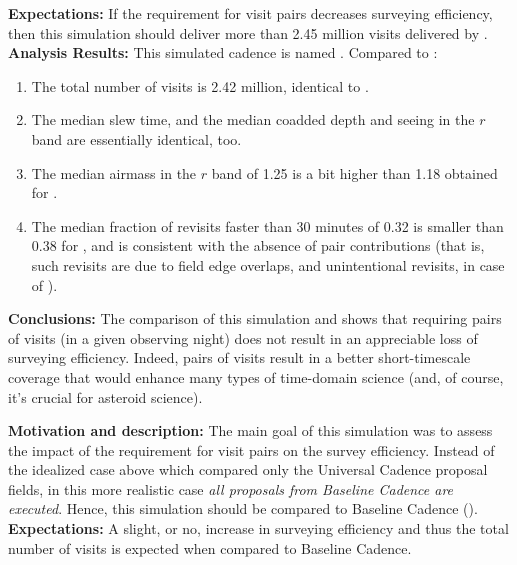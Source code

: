 {\bf Expectations:} If the requirement for visit pairs decreases
surveying efficiency, then this simulation should deliver more than
2.45 million visits delivered by . \\

{\bf Analysis Results:} This simulated cadence is named . Compared
to :
\begin{enumerate}
\item The total number of visits is 2.42 million, identical to .
\item The median slew time, and the median coadded depth and seeing in the $r$ band
are essentially identical, too.
\item The median airmass in the $r$ band of 1.25 is a bit higher than 1.18 obtained
for .
\item The median fraction of revisits faster than 30 minutes of 0.32 is smaller than 0.38
for , and is consistent with the absence of pair contributions (that is,
such revisits are due to field edge overlaps, and unintentional revisits, in case of ).
\end{enumerate}

{\bf Conclusions:} The comparison of this simulation and
 shows that requiring pairs of visits (in a
given observing night) does not result in an appreciable loss of
surveying efficiency. Indeed, pairs of visits result in a better
short-timescale coverage that would enhance many types of time-domain
science (and, of course, it's crucial for asteroid science).




{\bf Motivation and description:} The main goal of this simulation was
to assess the impact of the requirement for visit pairs on the survey
efficiency. Instead of the idealized case above which compared only
the Universal Cadence proposal fields, in this more realistic case
{\it all proposals from Baseline Cadence are executed}. Hence, this
simulation should be compared to Baseline Cadence
(). \\

{\bf Expectations:} A slight, or no, increase in surveying efficiency
and thus the total number of visits is expected when compared to
Baseline Cadence. \\

